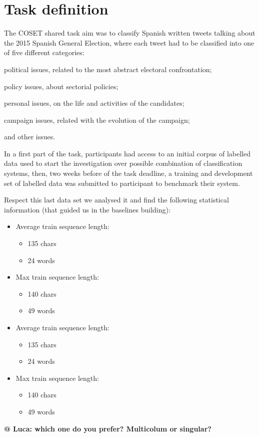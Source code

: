 \section{Task definition} \label{sec:task}

The COSET shared task aim was to classify Spanish written tweets talking about the 2015 Spanish General Election, where each tweet had to be classified into one of five different categories:
\begin{enumerate*}
\item political issues, related to the most abstract electoral confrontation; 
\item policy issues, about sectorial policies; 
\item personal issues, on the life and activities of the candidates; 
\item campaign issues, related with the evolution of the campaign;
\item and other issues.
\end{enumerate*}

In a first part of the task, participants had access to an initial corpus of labelled data used to start the investigation over possible combination of classification systems, then, two weeks before of the task deadline, a training and development set of labelled data was submitted to participant to benchmark their system.

Respect this last data set we analysed it and find the following statistical information (that guided us in the baselines building):
\begin{itemize}
	\item Average train sequence length:
	\begin{itemize}
		\item 135 chars 
		\item 24 words
	\end{itemize}
	\item Max train sequence length: 
	\begin{itemize}
		\item 140 chars
		\item 49 words
	\end{itemize}
\end{itemize}

\begin{multicols}{2}
\begin{itemize}
	\item Average train sequence length:
	\begin{itemize}
		\item 135 chars 
		\item 24 words
	\end{itemize}
	\item Max train sequence length: 
	\begin{itemize}
		\item 140 chars
		\item 49 words
	\end{itemize}
\end{itemize}
\end{multicols}



\textbf{@ Luca: which one do you prefer? Multicolum or singular?}
